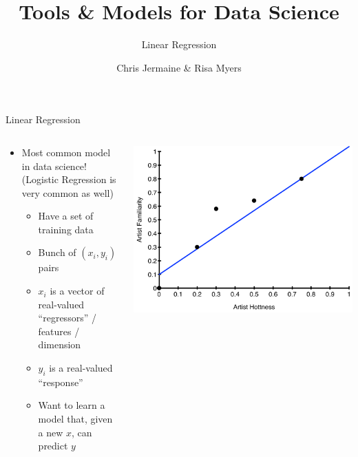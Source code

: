 \documentclass[aspectratio=169]{beamer}
\title[]
{Tools \& Models for Data Science}
\subtitle{Linear Regression}
\author[]{Chris Jermaine \& Risa Myers}
\institute
{
  Rice University 
}
\date[]{}
\begin{document}

\begin{frame}
 \titlepage
\end{frame}

\begin{frame}{Linear Regression}

\begin{columns}
\begin{column}{0.5\textwidth}
\begin{itemize}
	\item Most common model in data science! (Logistic Regression is very common as well)
	\begin{itemize}
		\item Have a set of training data
		\item Bunch of $(x_i, y_i)$ pairs
		\item $x_i$ is a vector of real-valued ``regressors'' / features / dimension
		\item $y_i$ is a real-valued ``response''
		\item Want to learn a model that, given a new $x$, can predict $y$
	\end{itemize}
\end{itemize}
 \end{column}
\begin{column}{0.5\textwidth}
     \includegraphics[width=1\textwidth]{lectLR/hotVsFam.pdf} 
\end{column}
 \end{columns}

\end{frame}
\end{document}

